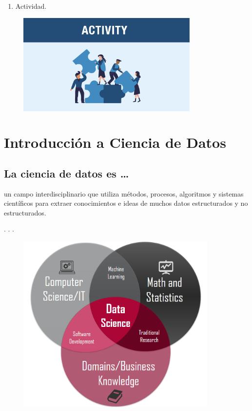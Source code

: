\documentclass[
  letterpaper,
  DIV=11,
  numbers=noendperiod]{scrartcl}
\providecommand{\tightlist}{%
  \setlength{\itemsep}{0pt}\setlength{\parskip}{0pt}}\usepackage{longtable,booktabs,array}
\begin{document}
\begin{enumerate}
\def\labelenumi{\arabic{enumi}.}
\setcounter{enumi}{2}
\tightlist
\item
  Actividad.
\end{enumerate}

\begin{figure}

\includegraphics[width=3.55208in,height=\textheight]{images/clipboard-4224793803.png} \hfill{}

\end{figure}

\hypertarget{introducciuxf3n-a-ciencia-de-datos}{%
\section{Introducción a Ciencia de
Datos}\label{introducciuxf3n-a-ciencia-de-datos}}

\hypertarget{la-ciencia-de-datos-es}{%
\subsection{La ciencia de datos es
\ldots{}}\label{la-ciencia-de-datos-es}}

un campo interdisciplinario que utiliza métodos, procesos, algoritmos y
sistemas científicos para extraer conocimientos e ideas de muchos datos
estructurados y no estructurados.

. . .

\begin{figure}

{\centering \includegraphics[width=3.92708in,height=\textheight]{images/clipboard-2707460623.png}

}

\end{figure}
\end{document}

